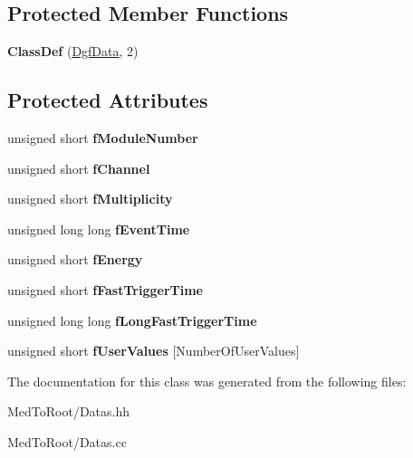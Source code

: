 \subsection*{Protected Member Functions}
\begin{DoxyCompactItemize}
\item 
\hypertarget{class_dgf_data_a2347fc4e4a77bba56c25f979f2a9fc14}{{\bfseries Class\-Def} (\hyperlink{class_dgf_data}{Dgf\-Data}, 2)}\label{class_dgf_data_a2347fc4e4a77bba56c25f979f2a9fc14}

\end{DoxyCompactItemize}
\subsection*{Protected Attributes}
\begin{DoxyCompactItemize}
\item 
\hypertarget{class_dgf_data_a4d69c87a370a0451ddad97148e6f1ad5}{unsigned short {\bfseries f\-Module\-Number}}\label{class_dgf_data_a4d69c87a370a0451ddad97148e6f1ad5}

\item 
\hypertarget{class_dgf_data_ab3184c2ceca7dcfe3d8374f42c6bd398}{unsigned short {\bfseries f\-Channel}}\label{class_dgf_data_ab3184c2ceca7dcfe3d8374f42c6bd398}

\item 
\hypertarget{class_dgf_data_a34644ed74a2c8884d51b38fc49247925}{unsigned short {\bfseries f\-Multiplicity}}\label{class_dgf_data_a34644ed74a2c8884d51b38fc49247925}

\item 
\hypertarget{class_dgf_data_a8f7d1c87b06dbe1018b267b5410470d7}{unsigned long long {\bfseries f\-Event\-Time}}\label{class_dgf_data_a8f7d1c87b06dbe1018b267b5410470d7}

\item 
\hypertarget{class_dgf_data_abab9885fd2b0bae4459f5c98d6886784}{unsigned short {\bfseries f\-Energy}}\label{class_dgf_data_abab9885fd2b0bae4459f5c98d6886784}

\item 
\hypertarget{class_dgf_data_a9dbabd6693e7b930ee8d3900030a5a86}{unsigned short {\bfseries f\-Fast\-Trigger\-Time}}\label{class_dgf_data_a9dbabd6693e7b930ee8d3900030a5a86}

\item 
\hypertarget{class_dgf_data_a1132a37b4a42fde6155f641a97ac2353}{unsigned long long {\bfseries f\-Long\-Fast\-Trigger\-Time}}\label{class_dgf_data_a1132a37b4a42fde6155f641a97ac2353}

\item 
\hypertarget{class_dgf_data_a91de5e4d052cf02e461bf1d8021dc78e}{unsigned short {\bfseries f\-User\-Values} \mbox{[}Number\-Of\-User\-Values\mbox{]}}\label{class_dgf_data_a91de5e4d052cf02e461bf1d8021dc78e}

\end{DoxyCompactItemize}


The documentation for this class was generated from the following files\-:\begin{DoxyCompactItemize}
\item 
Med\-To\-Root/Datas.\-hh\item 
Med\-To\-Root/Datas.\-cc\end{DoxyCompactItemize}
